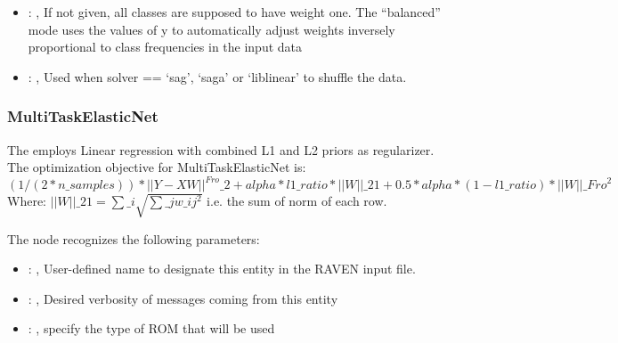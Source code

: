 \begin{itemize}
    \item {}: \xmlDesc{[balanced]}, 
      If not given, all classes are supposed to have weight one.
      The “balanced” mode uses the values of y to automatically adjust weights
      inversely proportional to class frequencies in the input data

    \item {}: , 
      Used when solver == ‘sag’, ‘saga’ or ‘liblinear’ to shuffle the data.
  \end{itemize}


\subsubsection{MultiTaskElasticNet}
  The  employs                         Linear regression with combined
  L1 and L2 priors as regularizer.                         The optimization objective for
  MultiTaskElasticNet is:                         $(1 / (2 * n\_samples)) * ||Y - XW||^{Fro}\_2
  + alpha * l1\_ratio * ||W||\_{21}                         + 0.5 * alpha * (1 - l1\_ratio) *
  ||W||\_{Fro}^2$                         \\Where:                         $||W||\_{21} = \sum\_i
  \sqrt{\sum\_j w\_{ij}^2}$                         i.e. the sum of norm of each row.

  The  node recognizes the following parameters:
    \begin{itemize}
      \item {}: , 
        User-defined name to designate this entity in the RAVEN input file.
      \item {}: , 
        Desired verbosity of messages coming from this entity
      \item {}: , 
        specify the type of ROM that will be used
  \end{itemize}

